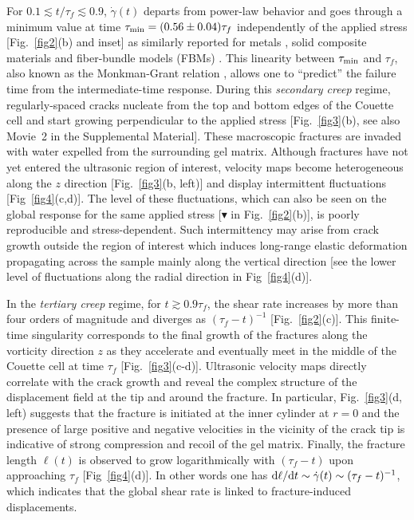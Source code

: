 \documentclass[twocolumn,superscriptaddress,showpacs,preprintnumbers,amsmath,amssymb,prl]{revtex4}
\newcommand\gp{\dot\gamma}
\begin{document}
For $0.1\lesssim t/\tau_f\lesssim 0.9$, $\gp(t)$ departs from power-law behavior and goes through a minimum value at time $\tau_{\rm min}= (0.56\pm0.04)\tau_f$ independently of the applied stress [Fig.~\ref{fig2}(b) and inset] as similarly reported for metals \cite{Sundararajan:1989}, solid composite materials \cite{Nechad:2005} and fiber-bundle models (FBMs) \cite{Kovacs:2008,Jagla:2011}. This linearity between $\tau_{\rm min}$ and $\tau_f$, also known as the Monkman-Grant relation \cite{Monkman:1956}, allows one to ``predict'' the failure time from the intermediate-time response. During this {\it secondary creep} regime, regularly-spaced cracks nucleate from the top and bottom edges of the Couette cell and start growing perpendicular to the applied stress [Fig.~\ref{fig3}(b), see also Movie~2 in the Supplemental Material]. These macroscopic fractures are invaded with water expelled from the surrounding gel matrix. Although fractures have not yet entered the ultrasonic region of interest, velocity maps become heterogeneous along the $z$ direction [Fig.~\ref{fig3}(b, left)] and display intermittent fluctuations [Fig~\ref{fig4}(c,d)]. The level of these fluctuations, which can also be seen on the global response for the same applied stress [\textcolor{red!50!black}{$\blacktriangledown$} in Fig.~\ref{fig2}(b)], is poorly reproducible and stress-dependent. Such intermittency may arise from crack growth outside the region of interest which induces long-range elastic deformation propagating across the sample mainly along the vertical direction [see the lower level of fluctuations along the radial direction in Fig~\ref{fig4}(d)].

In the {\it tertiary creep} regime, for $t\gtrsim 0.9\tau_f$, the shear rate increases by more than four orders of magnitude and diverges as $(\tau_f-t)^{-1}$ [Fig.~\ref{fig2}(c)]. This finite-time singularity corresponds to the final growth of the fractures along the vorticity direction $z$ as they accelerate and eventually meet in the middle of the Couette cell at time $\tau_f$ [Fig.~\ref{fig3}(c-d)]. Ultrasonic velocity maps directly correlate with the crack growth and reveal the complex structure of the displacement field at the tip and around the fracture. In particular, Fig.~\ref{fig3}(d, left) suggests that the fracture is initiated at the inner cylinder at $r=0$ and the presence of large positive and negative velocities in the vicinity of the crack tip is indicative of strong compression and recoil of the gel matrix. Finally, the fracture length $\ell(t)$ is observed to grow logarithmically with $(\tau_f-t)$ upon approaching $\tau_f$ [Fig~\ref{fig4}(d)]. In other words one has ${\rm d}\ell/{\rm d}t\sim\gp(t)\sim (\tau_f-t)^{-1}$, which indicates that the global shear rate is linked to fracture-induced displacements.
\end{document}
